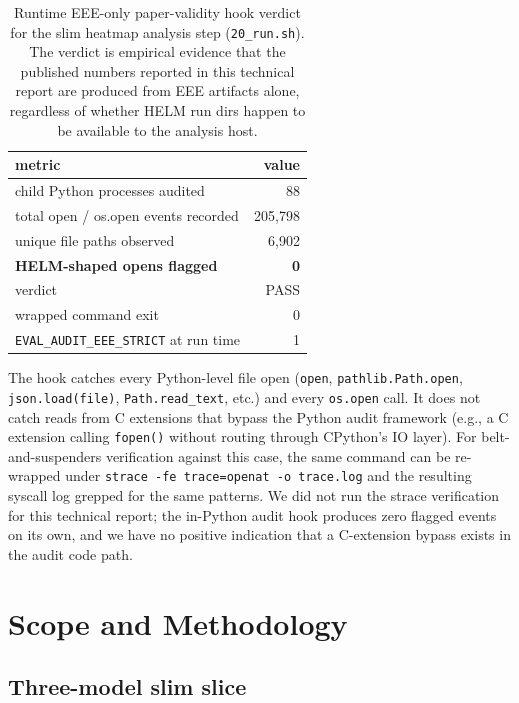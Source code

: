 \documentclass[11pt]{article}
\begin{document}
\begin{table}[htbp]
\centering
\small
\caption{Runtime EEE-only paper-validity hook verdict for the slim
  heatmap analysis step (\texttt{20\_run.sh}).
The verdict is empirical evidence that the published numbers
  reported in this technical report are produced from EEE artifacts
  alone, regardless of whether HELM run dirs happen to be available
  to the analysis host.}
\label{tab:tr-audit-verdict}
\begin{tabular}{lr}
\toprule
metric & value \\
\midrule
child Python processes audited      & 88 \\
total open / os.open events recorded & 205{,}798 \\
unique file paths observed          & 6{,}902 \\
\textbf{HELM-shaped opens flagged}  & \textbf{0} \\
\midrule
verdict & PASS \\
wrapped command exit                & 0 \\
\texttt{EVAL\_AUDIT\_EEE\_STRICT} at run time & 1 \\
\bottomrule
\end{tabular}
\end{table}

The hook catches every Python-level file open (\texttt{open},
  \texttt{pathlib.Path.open}, \texttt{json.load(file)},
  \texttt{Path.read\_text}, etc.) and every \texttt{os.open} call.
It does not catch reads from C extensions that bypass the Python audit
  framework (e.g., a C extension calling \texttt{fopen()} without
  routing through CPython's IO layer).
For belt-and-suspenders verification against this case, the same
  command can be re-wrapped under
  \texttt{strace -fe trace=openat -o trace.log} and the resulting
  syscall log grepped for the same patterns.
We did not run the strace verification for this technical report;
  the in-Python audit hook produces zero flagged events on its own,
  and we have no positive indication that a C-extension bypass
  exists in the audit code path.


\section{Scope and Methodology}
\label{sec:tr-scope}

\subsection{Three-model slim slice}
\label{sec:tr-slim-models}
\end{document}
